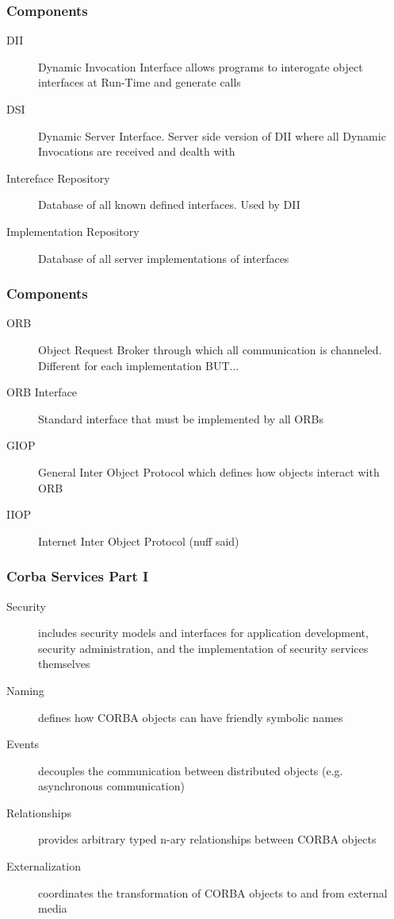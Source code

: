 \documentclass{beamer}
\begin{document}
 
    \begin{frame}
    	\frametitle{Components}
    	\begin{description}
    		\item[DII] 	Dynamic Invocation Interface allows programs to interogate object interfaces at Run-Time and generate calls
    		\item[DSI] Dynamic Server Interface. Server side version of DII where all Dynamic Invocations are received and dealth with

    		\item[Intereface Repository] 	Database of all known defined interfaces. Used by DII
    		\item[Implementation Repository] Database of all server implementations of interfaces
    		
    	\end{description}
    	
    \end{frame}           
    \begin{frame}
    	\frametitle{Components}
    	\begin{description}
    		\item[ORB] 	Object Request Broker through which all communication is channeled. Different for each implementation BUT...
    		\item[ORB Interface] Standard interface that must be implemented by all ORBs 
    		\item[GIOP] 	General Inter Object Protocol which defines how objects interact with ORB
    		\item[IIOP] 	Internet Inter Object Protocol (nuff said)
    		
    	\end{description}
    	
    \end{frame}            
    \begin{frame}
    	\frametitle{Corba Services Part I}
    	\begin{description}
    		\item[Security] 	includes security models and interfaces for application development, security administration, and the implementation of security services themselves
    		\item[Naming] 	defines how CORBA objects can have friendly symbolic names
    		\item[Events] 	decouples the communication between distributed objects (e.g. asynchronous communication)
    		\item[Relationships] 	provides arbitrary typed n-ary relationships between CORBA objects
    		\item[Externalization] 	coordinates the transformation of CORBA objects to and from external media

    	\end{description}

    \end{frame}
    
\end{document}
